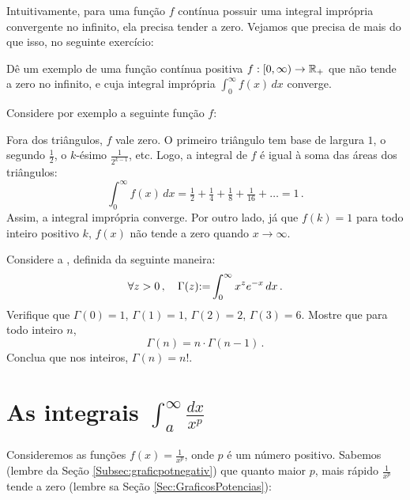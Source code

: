 Intuitivamente, para uma função $f$ 
contínua possuir uma integral imprópria convergente no infinito, ela precisa
tender a zero.  Vejamos que precisa de mais do que isso, no seguinte
exercício:
\begin{exo}\label{Exo:tendpasverzerointfinie}
Dê um exemplo de uma função contínua positiva $f:[0,\infty)\to \mathbb{R}_+$ que não
tende a zero no infinito, 
e cuja integral imprópria $\int_0^\infty f(x)\,dx$ converge.
\begin{sol}
Considere por exemplo a seguinte função $f$:
\begin{center}
\begin{bmlimage}\end{bmlimage}
\end{center}
Fora dos triângulos, $f$ vale zero.
O primeiro triângulo tem base de largura $1$, o segundo $\frac{1}{2}$, o
$k$-ésimo $\frac{1}{2^{k-1}}$, etc. Logo, a integral de $f$ é igual à soma
das áreas dos triângulos:
$$
\int_0^\infty f(x)\,dx=\tfrac12+\tfrac14+\tfrac18+\tfrac{1}{16}+\dots=1\,.
$$
Assim, a integral imprópria converge. Por outro lado, já que $f(k)=1$ para
todo inteiro positivo $k$, $f(x)$ não tende a zero quando $x\to \infty$.
\end{sol}
\end{exo}

\begin{exo}
Considere a , definida da seguinte maneira:
\[ 
\forall z>0\,,\quad \Gamma(z){:=} \int_0^\infty x^ze^{-x}\,dx\,.
\]
Verifique que $\Gamma(0)=1$, $\Gamma(1)=1$, $\Gamma(2)=2$, $\Gamma(3)=6$.
Mostre que para todo inteiro $n$,
\[ 
\Gamma(n)=n\cdot \Gamma(n-1)\,.
\]
Conclua que nos inteiros, $\Gamma(n)=n!$.
\end{exo}

\section{As integrais $\int_a^\infty\frac{dx}{x^p}$}

Consideremos as funções $f(x)=\frac{1}{x^p}$, onde $p$ é um número positivo.
Sabemos (lembre da Seção \ref{Subsec:graficpotnegativ}) que quanto maior $p$,
mais rápido $\tfrac{1}{x^p}$ tende a zero (lembre sa Seção
\ref{Sec:GraficosPotencias}):

